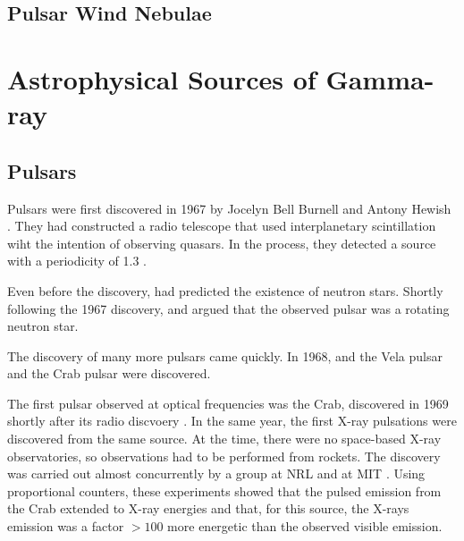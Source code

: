 
\subsection{Pulsar Wind Nebulae}





\section{Astrophysical Sources of Gamma-ray}
\subsection{Pulsars}


Pulsars were first discovered in 1967 by Jocelyn Bell Burnell and Antony
Hewish \citep{hewish_1968_observation-rapidly}. They had constructed a
radio telescope that used interplanetary scintillation wiht the intention
of observing quasars.  In the process, they detected a source with a
periodicity of 1.3 \second.

Even before the discovery, \cite{pacini_1967_energy-emission} had predicted
the existence of neutron stars.  Shortly following the 1967 discovery,
\cite{gold_1968_rotating-neutron} and \cite{pacini_1968_rotating-neutron}
argued that the observed pulsar was a rotating neutron star.

The discovery of many more pulsars came quickly.  In 1968, and the
Vela pulsar \citep{large_1968_pulsar-supernova} and the Crab pulsar
\citep{staelin_1968_pulsating-radio} were discovered.

The first pulsar observed at optical frequencies was the
Crab, discovered in 1969 shortly after its radio discvoery
\citep{cocke_1969_discovery-optical}.
In the same year, the first X-ray pulsations were discovered from
the same source. At the time, there were no space-based X-ray
observatories, so observations had to be performed from rockets.
The discovery was carried out almost concurrently by a group
at \ac{NRL} \citep{fritz_1969_x-ray-pulsar} and at \ac{MIT}
\citep{bradt_1969_x-ray-optical}.  Using proportional counters,
these experiments showed that the pulsed emission from 
the Crab extended to X-ray energies and that, for this source,
the X-rays emission was a factor $>100$ more energetic than
the observed visible emission.

